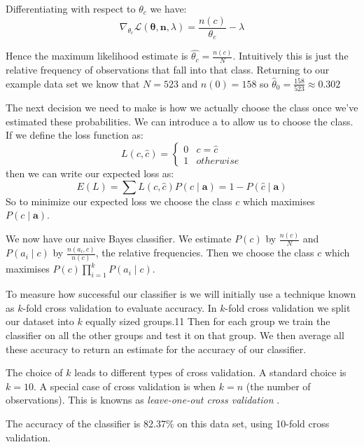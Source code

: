 Differentiating with respect to $\theta_c$ we have:
\begin{equation}
	\nabla_{\theta_c} \mathcal{L}(\mathbf{\theta}, \mathbf{n}, \lambda) = \frac{n(c)}{\theta_c} - \lambda
\end{equation}

Hence the maximum likelihood estimate is $\hat{\theta_c} = \frac{n(c)}{N}$.
Intuitively this is just the relative frequency of observations that fall into that class.
Returning to our example data set we know that $N=523$ and $n(0)=158$ so $\hat\theta_0 = \frac{158}{523} \approx 0.302$

The next decision we need to make is how we actually choose the class once we've estimated these probabilities.
We can introduce a  to allow us to choose the class.
If we define the loss function as:
\begin{equation}
	L(c, \hat{c}) = 
	\begin{cases}
		0 & c = \hat{c} \\
		1 & otherwise
	\end{cases}
\end{equation}
then we can write our expected loss as:
\begin{equation}
	E(L) = \sum L(c, \hat{c})P(c \mid \mathbf{a}) = 1 - P(\hat{c} \mid \mathbf{a})
\end{equation}
So to minimize our expected loss we choose the class $c$ which maximises $P(c \mid \mathbf{a})$.

We now have our naive Bayes classifier.
We estimate $P(c)$ by $\frac{n(c)}{N}$ and $P(a_i \mid c)$ by $\frac{n(a_i, c)}{n(c)}$, the relative frequencies.
Then we choose the class $c$ which maximises $P(c)\prod_{i=1}^{k}P(a_i \mid c)$.

To measure how successful our classifier is we will initially use a technique known as $k$-fold cross validation to evaluate accuracy.
In $k$-fold cross validation we split our dataset into $k$ equally sized groups.11
Then for each group we train the classifier on all the other groups and test it on that group.
We then average all these accuracy to return an estimate for the accuracy of our classifier.

The choice of $k$ leads to different types of cross validation.
A standard choice is $k=10$. A special case of cross validation is when $k=n$ (the number of observations).
This is knowns as \textit{leave-one-out cross validation} \cite{Priddy05}.

The accuracy of the classifier is 82.37\% on this data set, using 10-fold cross validation.

